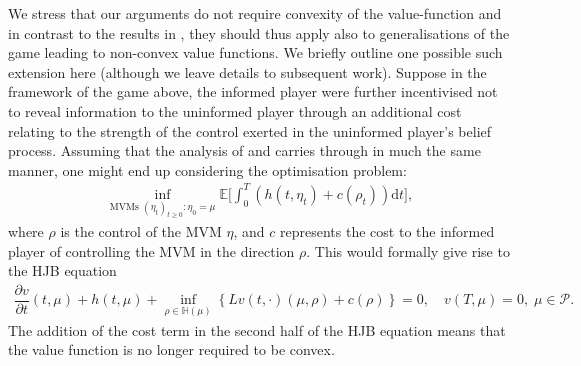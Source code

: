 \documentclass{article}
\theoremstyle{definition}
\numberwithin{equation}{section}
\numberwithin{theorem}{section}
\newcommand{\E}{\mathbb{E}}
\newcommand{\pian}[2]{\dfrac{\partial #1}{\partial #2}}
\newcommand{\dt}{\mathrm{d}t}
\newcommand{\Hb}{\mathbb{H}}
\newcommand{\Pc}{\mathcal{P}}
\begin{document}
        We stress that our arguments do not require convexity of the value-function and in contrast to the results in \cite{cardaliaguet2012}, they should thus apply also to generalisations of the game leading to non-convex value functions. We briefly outline one possible such extension here (although we leave details to subsequent work). Suppose in the framework of the game above, the informed player were further incentivised not to reveal information to the uninformed player through an additional cost relating to the strength of the control exerted in the uninformed player's belief process. Assuming that the analysis of \cite{cardaliaguet_rainer2009} and \cite{cardaliaguet2012} carries through in much the same manner, one might end up considering the optimisation problem:
	\begin{align*}%
		\inf_{\textrm{MVMs $(\eta_t)_{t\ge 0}:\eta_0=\mu$}}
		\E\Big[\int_0^T \left (h(t,\eta_t)+c(\rho_t)\right) \dt\Big],
	\end{align*}
	where $\rho$ is the control of the MVM $\eta$, and $c$ represents the cost to the informed player of controlling the MVM in the direction $\rho$. This would formally give rise to the HJB equation
        \begin{align*}%
          \pian{v}{t}(t,\mu)+h(t,\mu)
          + \inf_{\rho\in\Hb(\mu)}\left\{Lv(t,\cdot)(\mu,\rho)+c(\rho)\right\}
          =0,
          \quad v(T,\mu)=0,\;\mu\in\Pc.
        \end{align*}	 
        The addition of the cost term in the second half of the HJB equation means that the value function is no longer required to be convex. 
\end{document}
